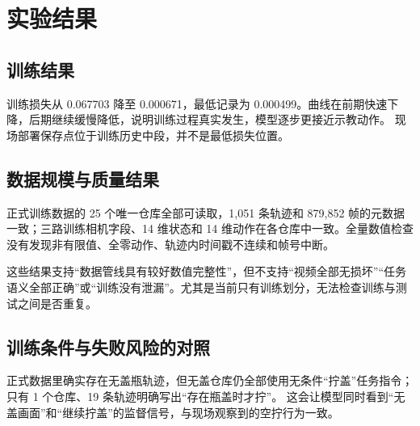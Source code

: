 \chapter{实验结果}

\section{训练结果}


训练损失从 0.067703 降至 0.000671，最低记录为 0.000499。曲线在前期快速下降，后期继续缓慢降低，说明训练过程真实发生，模型逐步更接近示教动作。 现场部署保存点位于训练历史中段，并不是最低损失位置。


\section{数据规模与质量结果}

正式训练数据的 25 个唯一仓库全部可读取，1,051 条轨迹和 879,852 帧的元数据一致；三路训练相机字段、14 维状态和 14 维动作在各仓库中一致。全量数值检查没有发现非有限值、全零动作、轨迹内时间戳不连续和帧号中断。

这些结果支持“数据管线具有较好数值完整性”，但不支持“视频全部无损坏”“任务语义全部正确”或“训练没有泄漏”。尤其是当前只有训练划分，无法检查训练与测试之间是否重复。

\section{训练条件与失败风险的对照}


正式数据里确实存在无盖瓶轨迹，但无盖仓库仍全部使用无条件“拧盖”任务指令；只有 1 个仓库、19 条轨迹明确写出“存在瓶盖时才拧”。 这会让模型同时看到“无盖画面”和“继续拧盖”的监督信号，与现场观察到的空拧行为一致。


